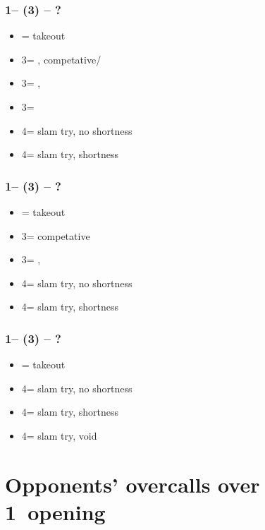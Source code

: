 \documentclass[12pt, a4paper]{report}
\begin{document}
\subsubsection*{1\hearts -- (3\clubs) -- ?}
\begin{itemize}
    \item \dbl = takeout
    \item 3\diams = \hearts, competative/\gf
    \item 3\hearts = \hearts, \inv
    \item 3\spades = \spades\ \gf
    \item 4\clubs = slam try, no \clubs shortness
    \item 4\diams = slam try, \clubs shortness
\end{itemize}

\subsubsection*{1\hearts -- (3\diams) -- ?}
\begin{itemize}
    \item \dbl = takeout
    \item 3\hearts = competative
    \item 3\spades = \spades, \gf
    \item 4\clubs = slam try, no \diams shortness
    \item 4\diams = slam try, \diams shortness
\end{itemize}

\subsubsection*{1\hearts -- (3\spades) -- ?}
\begin{itemize}
    \item \dbl = takeout
    \item 4\clubs = slam try, no \spades shortness
    \item 4\diams = slam try, \spades shortness
    \item 4\spades = slam try, \spades void
\end{itemize}

\section*{\colorbox{blue!30}{Opponents' overcalls over 1\spades\ opening}}
\end{document}
